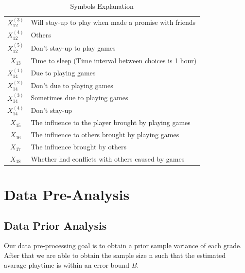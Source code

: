 \documentclass[scheme=plain]{ctexart}
\begin{document}
\begin{table}[H]
\begin{tabularx}{.8\textwidth}{cX}
                \rowcolor[HTML]{EFEFEF} $X_{12}^{(3)}$ & Will stay-up to play when made a promise with friends            \\
                                        $X_{12}^{(4)}$ & Others                                                           \\
                \rowcolor[HTML]{EFEFEF} $X_{12}^{(5)}$ & Don't stay-up to play games                                      \\
                                        $X_{13}$       & Time to sleep (Time interval between choices is 1 hour)          \\
                \rowcolor[HTML]{EFEFEF} $X_{14}^{(1)}$ & Due to playing games                                             \\
                                        $X_{14}^{(2)}$ & Don't due to playing games                                       \\
                \rowcolor[HTML]{EFEFEF} $X_{14}^{(3)}$ & Sometimes due to playing games                                   \\
                                        $X_{14}^{(4)}$ & Don't stay-up                                                    \\
                \rowcolor[HTML]{EFEFEF} $X_{15}$       & The influence to the player brought by playing games             \\
                                        $X_{16}$       & The influence to others brought by playing games                 \\
                \rowcolor[HTML]{EFEFEF} $X_{17}$       & The influence brought by others                                  \\
                                        $X_{18}$       & Whether had conflicts with others caused by games                \\ \bottomrule
        \end{tabularx}
        \caption{Symbols Explanation}\label{T:symbols-explanation}
\end{table}



\section{Data Pre-Analysis}
\subsection{Data Prior Analysis}
Our data pre-processing goal is to obtain a prior sample variance of each grade. After that we are able to obtain the sample size n such that the estimated avarage playtime is within an error bound $B$.
\end{document}
